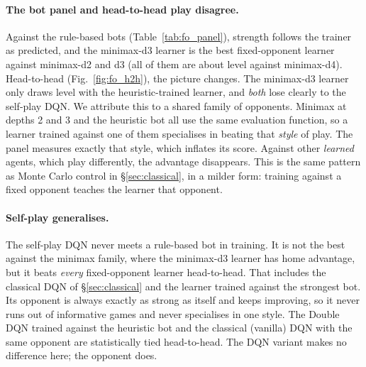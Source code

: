 \documentclass[11pt]{article}
\begin{document}
\paragraph{The bot panel and head-to-head play disagree.} Against the
rule-based bots (Table~\ref{tab:fo_panel}), strength follows the trainer as
predicted, and the minimax-d3 learner is the best fixed-opponent learner
against minimax-d2 and d3 (all of them are about level against minimax-d4). Head-to-head (Fig.~\ref{fig:fo_h2h}), the picture
changes. The minimax-d3 learner only draws level with the heuristic-trained
learner, and \emph{both} lose clearly to the self-play DQN. We attribute this to
a shared family of opponents. Minimax at depths 2 and 3 and the heuristic bot
all use the same evaluation function, so a learner trained against one of them
specialises in beating that \emph{style} of play. The panel measures exactly
that style, which inflates its score. Against other \emph{learned} agents,
which play differently, the advantage disappears. This is the same pattern as
Monte Carlo control in \S\ref{sec:classical}, in a milder form: training
against a fixed opponent teaches the learner that opponent.

\paragraph{Self-play generalises.} The self-play DQN never meets a rule-based
bot in training. It is not the best against the minimax family, where the
minimax-d3 learner has home advantage, but it beats \emph{every} fixed-opponent
learner head-to-head. That includes the classical DQN of \S\ref{sec:classical} and the learner
trained against the strongest bot. Its opponent is always exactly as strong as
itself and keeps improving, so it never runs out of informative games and
never specialises in one style. The Double DQN trained against the heuristic
bot and the classical (vanilla) DQN with the same opponent are statistically
tied head-to-head. The DQN variant makes no difference here; the opponent does.
\end{document}
